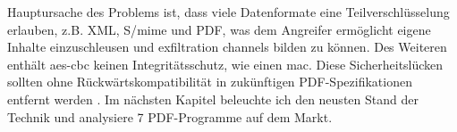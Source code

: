 Hauptursache des Problems ist, dass viele Datenformate eine Teilverschlüsselung erlauben, z.B. XML, S/\gls{mime} und PDF, was dem Angreifer ermöglicht eigene Inhalte einzuschleusen und exfiltration channels bilden zu können. Des Weiteren enthält \gls{aes}-\gls{cbc} keinen Integritätsschutz, wie einen \gls{mac}. Diese Sicherheitslücken sollten ohne Rückwärtskompatibilität in zukünftigen PDF-Spezifikationen entfernt werden \cite{pdfex}. Im nächsten Kapitel beleuchte ich den neusten Stand der Technik und analysiere 7 PDF-Programme auf dem Markt.